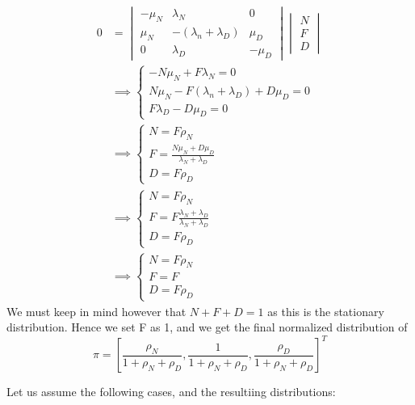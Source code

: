 \documentclass{article}
\begin{document}
\begin{align*}
    0 &= \begin{vmatrix}
    -\mu_N & \lambda_N & 0\\
    \mu_N & -(\lambda_n + \lambda_D) & \mu_D\\
    0 & \lambda_D & - \mu_D
\end{vmatrix}\begin{vmatrix}
    N \\ F \\ D
\end{vmatrix}\\
&\implies\begin{cases}
    -N\mu_N + F\lambda_N = 0\\
    N\mu_N  -F(\lambda_n + \lambda_D) + D\mu_D=0\\
    F\lambda_D  - D\mu_D=0
\end{cases}\\
&\implies\begin{cases}
    N=F\rho_N\\
    F = \frac{N\mu_N + D\mu_D}{\lambda_N + \lambda_D}\\
    D = F\rho_D
\end{cases}\\
&\implies\begin{cases}
    N=F\rho_N\\
    F = F\frac{\lambda_N + \lambda_D}{\lambda_N + \lambda_D}\\
    D = F\rho_D
\end{cases}\\
&\implies\begin{cases}
    N=F\rho_N\\
    F = F\\
    D = F\rho_D
\end{cases}
\end{align*}
We must keep in mind however that $N+F+D = 1$ as this is the stationary distribution. Hence we set F as 1, and we get
the final normalized distribution of \[\pi = \left[\frac{\rho_N}{1 + \rho_N + \rho_D},\frac{1}{1 + \rho_N + \rho_D},\frac{\rho_D}{1 + \rho_N + \rho_D}\right]^T\]

Let us assume the following cases, and the resultiing distributions:
\end{document}
